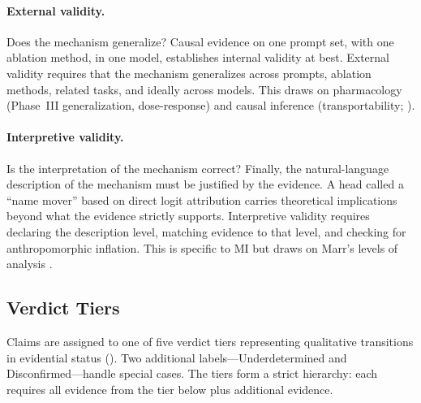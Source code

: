 \documentclass[10pt]{article}
\begin{document}
\paragraph{External validity.} Does the mechanism generalize? Causal evidence on one prompt set, with one ablation method, in one model, establishes internal validity at best. External validity requires that the mechanism generalizes across prompts, ablation methods, related tasks, and ideally across models. This draws on pharmacology (Phase~III generalization, dose-response) and causal inference (transportability; \citealp{pearl2011transportability}).

\paragraph{Interpretive validity.} Is the interpretation of the mechanism correct? Finally, the natural-language description of the mechanism must be justified by the evidence. A head called a ``name mover'' based on direct logit attribution carries theoretical implications beyond what the evidence strictly supports. Interpretive validity requires declaring the description level, matching evidence to that level, and checking for anthropomorphic inflation. This is specific to MI but draws on Marr's levels of analysis \citep{marr1982vision}.

\subsection{Verdict Tiers}
\label{sec:verdict-tiers}

Claims are assigned to one of five verdict tiers representing qualitative transitions in evidential status (). Two additional labels---Underdetermined and Disconfirmed---handle special cases. The tiers form a strict hierarchy: each requires all evidence from the tier below plus additional evidence.
\end{document}

